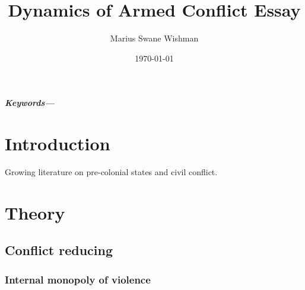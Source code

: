 \documentclass[12pt]{article}
\title{Dynamics of Armed Conflict Essay}
\author[1]{Marius Swane Wishman}
\affil[1]{Department of Sociology and Political Science, NTNU}
\date{\today}
\providecommand{\keywords}[1]
{
	\small	
	\textbf{\textit{Keywords---}} #1
}
\begin{document}
\maketitle

\begin{abstract}

\end{abstract}

\keywords{}

\pagebreak


\onehalfspacing

\section{Introduction}

Growing literature on pre-colonial states and civil conflict.

\section{Theory}

\subsection{Conflict reducing}

\subsubsection{Internal monopoly of violence}
\end{document}
